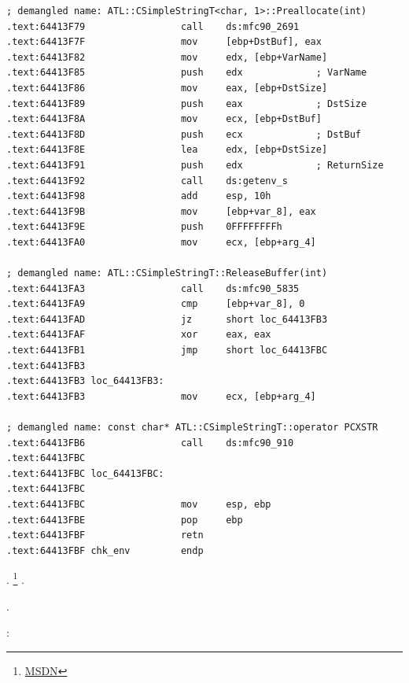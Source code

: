 \begin{lstlisting}
; demangled name: ATL::CSimpleStringT<char, 1>::Preallocate(int)
.text:64413F79                 call    ds:mfc90_2691
.text:64413F7F                 mov     [ebp+DstBuf], eax
.text:64413F82                 mov     edx, [ebp+VarName]
.text:64413F85                 push    edx             ; VarName
.text:64413F86                 mov     eax, [ebp+DstSize]
.text:64413F89                 push    eax             ; DstSize
.text:64413F8A                 mov     ecx, [ebp+DstBuf]
.text:64413F8D                 push    ecx             ; DstBuf
.text:64413F8E                 lea     edx, [ebp+DstSize]
.text:64413F91                 push    edx             ; ReturnSize
.text:64413F92                 call    ds:getenv_s
.text:64413F98                 add     esp, 10h
.text:64413F9B                 mov     [ebp+var_8], eax
.text:64413F9E                 push    0FFFFFFFFh
.text:64413FA0                 mov     ecx, [ebp+arg_4]

; demangled name: ATL::CSimpleStringT::ReleaseBuffer(int)
.text:64413FA3                 call    ds:mfc90_5835
.text:64413FA9                 cmp     [ebp+var_8], 0
.text:64413FAD                 jz      short loc_64413FB3
.text:64413FAF                 xor     eax, eax
.text:64413FB1                 jmp     short loc_64413FBC
.text:64413FB3
.text:64413FB3 loc_64413FB3:
.text:64413FB3                 mov     ecx, [ebp+arg_4]

; demangled name: const char* ATL::CSimpleStringT::operator PCXSTR 
.text:64413FB6                 call    ds:mfc90_910
.text:64413FBC
.text:64413FBC loc_64413FBC:
.text:64413FBC
.text:64413FBC                 mov     esp, ebp
.text:64413FBE                 pop     ebp
.text:64413FBF                 retn
.text:64413FBF chk_env         endp
\end{lstlisting}

.  \footnote{\href{http://go.yurichev.com/17250}{MSDN}} 
.

.

:

